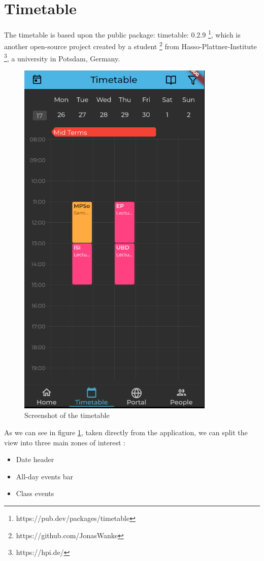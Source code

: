 \section{Timetable} \label{5:timetable}

The timetable is based upon the public package: timetable: 0.2.9 \footnote{https://pub.dev/packages/timetable}, which is another open-source project created by a student \footnote{https://github.com/JonasWanke} from Hasso-Plattner-Institute \footnote{https://hpi.de/}, a university in Potsdam, Germany.

\begin{figure}
            \centering
            \includegraphics[width=0.5\columnwidth]{figures/c5/image21.png}
            \captionsetup{labelsep=space}
            \caption{Screenshot of the timetable}
            \label{5:fig:timetable}
        \end{figure}
	As we can see in figure \ref{5:fig:timetable}, taken directly from the application, we can split the view into three main zones of interest : 

	\begin{itemize}
            \setlength{\topsep}{0.5pt}
            \setlength{\itemsep}{0.5pt}
            \setlength{\parsep}{0.5pt}
            \item Date header
            \item All-day events bar
            \item Class events 
            
\end{itemize}



